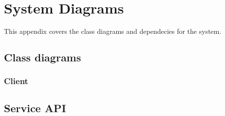 \chapter{System Diagrams}
\label{Appendix_Diagrams}
This appendix covers the class diagrams and dependecies for the system.
\section{Class diagrams}
\label{Appendix_Diagrams_Class}

\subsection{Client}
\label{Appendix_Diagrams_Class_Client}

\section{Service API}
\label{Appendix_Diagrams_ServiceAPI}